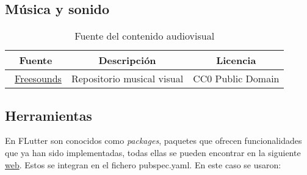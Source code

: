 \subsection{Música y sonido}

\begin{table}[H]
	\begin{center}
		\begin{tabular}{ccc}
			\hline
			Fuente                        & Descripción & Licencia  	\\ \hline
			~\href{https://www.zapsplat.com/}{Freesounds}				    & Repositorio musical visual  & CC0 Public Domain   		\\\hline
			
		\end{tabular}
		\caption{Fuente del contenido audiovisual}
		\label{table:fuentesonido}
	\end{center}
\end{table}

\subsection{Herramientas}
En FLutter son conocidos como \emph{packages}, paquetes que ofrecen funcionalidades que ya han sido implementadas, todas ellas se pueden encontrar en la siguiente \href{https://pub.dev/}{web}. Estos se integran en el fichero pubspec.yaml. En este caso se usaron: 



